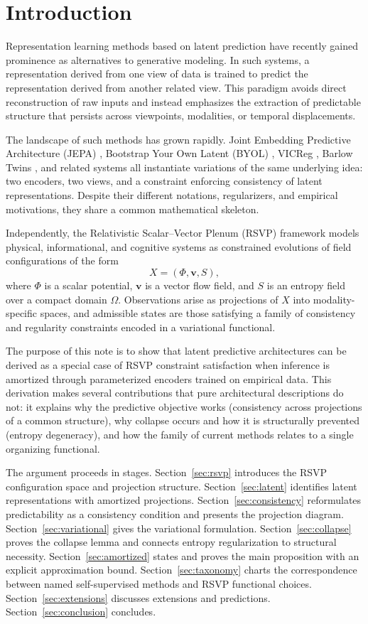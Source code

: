 \documentclass[12pt, oneside]{article}
\begin{document}
\section{Introduction}

Representation learning methods based on latent prediction have recently gained prominence as alternatives to generative modeling. In such systems, a representation derived from one view of data is trained to predict the representation derived from another related view. This paradigm avoids direct reconstruction of raw inputs and instead emphasizes the extraction of predictable structure that persists across viewpoints, modalities, or temporal displacements.

The landscape of such methods has grown rapidly. Joint Embedding Predictive Architecture (JEPA) \cite{LeCun2022}, Bootstrap Your Own Latent (BYOL) \cite{Grill2020}, VICReg \cite{Bardes2022}, Barlow Twins \cite{Zbontar2021}, and related systems all instantiate variations of the same underlying idea: two encoders, two views, and a constraint enforcing consistency of latent representations. Despite their different notations, regularizers, and empirical motivations, they share a common mathematical skeleton.

Independently, the Relativistic Scalar--Vector Plenum (RSVP) framework models physical, informational, and cognitive systems as constrained evolutions of field configurations of the form
\[
X = (\Phi, \mathbf{v}, S),
\]
where $\Phi$ is a scalar potential, $\mathbf{v}$ is a vector flow field, and $S$ is an entropy field over a compact domain $\Omega$. Observations arise as projections of $X$ into modality-specific spaces, and admissible states are those satisfying a family of consistency and regularity constraints encoded in a variational functional.

The purpose of this note is to show that latent predictive architectures can be derived as a special case of RSVP constraint satisfaction when inference is amortized through parameterized encoders trained on empirical data. This derivation makes several contributions that pure architectural descriptions do not: it explains why the predictive objective works (consistency across projections of a common structure), why collapse occurs and how it is structurally prevented (entropy degeneracy), and how the family of current methods relates to a single organizing functional.

The argument proceeds in stages. Section~\ref{sec:rsvp} introduces the RSVP configuration space and projection structure. Section~\ref{sec:latent} identifies latent representations with amortized projections. Section~\ref{sec:consistency} reformulates predictability as a consistency condition and presents the projection diagram. Section~\ref{sec:variational} gives the variational formulation. Section~\ref{sec:collapse} proves the collapse lemma and connects entropy regularization to structural necessity. Section~\ref{sec:amortized} states and proves the main proposition with an explicit approximation bound. Section~\ref{sec:taxonomy} charts the correspondence between named self-supervised methods and RSVP functional choices. Section~\ref{sec:extensions} discusses extensions and predictions. Section~\ref{sec:conclusion} concludes.
\end{document}
